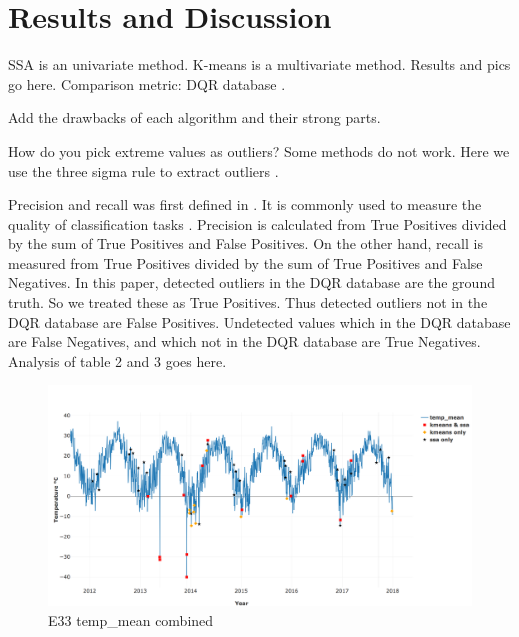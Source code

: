 \documentclass[letterpaper, 10 pt, conference]{ieeeconf}  %
\begin{document}
\section{Results and Discussion}
SSA is an univariate method. K-means is a multivariate method. Results and pics go here. Comparison metric: DQR database \cite{mccord2016arm}. 

Add the drawbacks of each algorithm and their strong parts.

How do you pick extreme values as outliers? Some methods do not work. Here we use the three sigma rule to extract outliers \cite{pukelsheim1994three}.

Precision and recall was first defined in \cite{perry1955machine}. It is commonly used to measure the quality of classification tasks \cite{olson2008advanced}. Precision is calculated from True Positives divided by the sum of True Positives and False Positives. On the other hand, recall is measured from True Positives divided by the sum of True Positives and False Negatives. In this paper, detected outliers in the DQR database are the ground truth. So we treated these as True Positives. Thus detected outliers not in the DQR database are False Positives. Undetected values which in the DQR database are False Negatives, and which not in the DQR database are True Negatives. Analysis of table 2 and 3 goes here.

\begin{figure}[ht]
    \centering
    \includegraphics[width=\textwidth]{combined.png}
    \caption{E33 temp\_mean combined}
    \label{fig:combined}
\end{figure}
\end{document}

